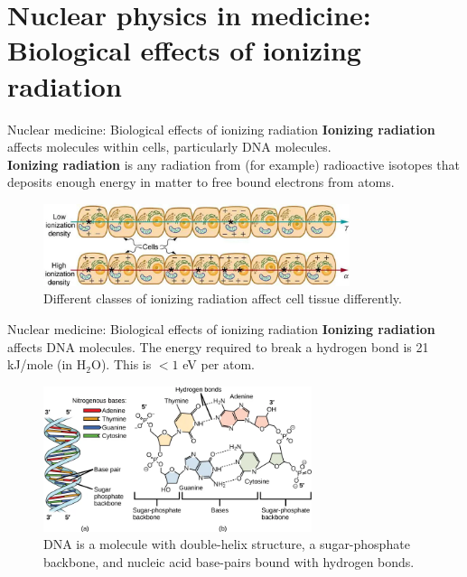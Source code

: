 \documentclass{beamer}
\begin{document}
\section{Nuclear physics in medicine: Biological effects of ionizing radiation}

\begin{frame}{Nuclear medicine: Biological effects of ionizing radiation}
\alert{\textbf{Ionizing radiation}} affects molecules within cells, particularly DNA molecules. \\ \vspace{0.25cm}
\small
\textbf{Ionizing radiation} is any radiation from (for example) radioactive isotopes that deposits enough energy in matter to free bound electrons from atoms.
\begin{figure}
\centering
\includegraphics[width=0.8\textwidth]{figures/cell.png}
\caption{\label{fig:cell_1} Different classes of ionizing radiation affect cell tissue differently.}
\end{figure}
\end{frame}

\begin{frame}{Nuclear medicine: Biological effects of ionizing radiation}
\small
\alert{\textbf{Ionizing radiation}} affects DNA molecules.  The energy required to break a hydrogen bond is 21 kJ/mole (in H$_2$O). This is $<1$ eV per atom.
\begin{figure}
\centering
\includegraphics[width=0.7\textwidth]{figures/dna.png}
\caption{\label{fig:cell_2} DNA is a molecule with double-helix structure, a sugar-phosphate backbone, and nucleic acid base-pairs bound with hydrogen bonds.}
\end{figure}
\end{frame}
\end{document}

